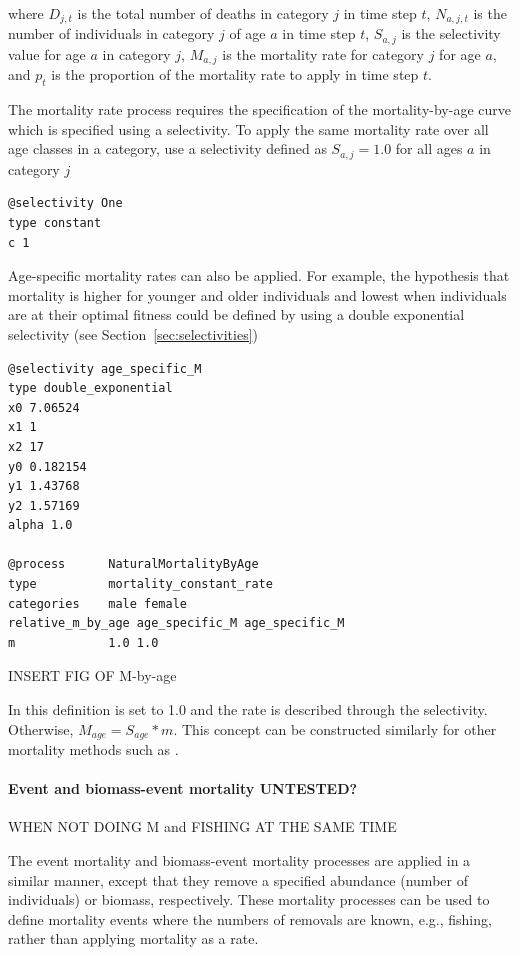where $D_{j,t}$ is the total number of deaths in category $j$ in time step $t$, $N_{a,j,t}$ is the number of individuals in category $j$ of age $a$ in time step $t$, $S_{a,j}$ is the selectivity value for age $a$ in category $j$, $M_{a,j}$ is the mortality rate for category $j$ for age $a$, and $p_t$ is the proportion of the mortality rate to apply in time step $t$.

The mortality rate process requires the specification of the mortality-by-age curve which is specified using a selectivity. To apply the same mortality rate over all age classes in a category, use a selectivity defined as $S_{a,j}=1.0$ for all ages $a$ in category $j$

{\small{\begin{verbatim}
@selectivity One
type constant
c 1
\end{verbatim}}}

Age-specific mortality rates can also be applied. For example, the hypothesis that mortality is higher for younger and older individuals and lowest when individuals are at their optimal fitness could be defined by using a double exponential selectivity (see Section~\ref{sec:selectivities})

{\small{\begin{verbatim}
@selectivity age_specific_M
type double_exponential
x0 7.06524
x1 1
x2 17
y0 0.182154
y1 1.43768
y2 1.57169
alpha 1.0

@process      NaturalMortalityByAge
type          mortality_constant_rate
categories    male female
relative_m_by_age age_specific_M age_specific_M
m             1.0 1.0
\end{verbatim}}}

INSERT FIG OF M-by-age

In this definition  is set to 1.0 and the rate is described through the selectivity. Otherwise, $M_{age} = S_{age} * m$. This concept can be constructed similarly for other mortality methods such as .

\paragraph{Event and biomass-event mortality UNTESTED?}

WHEN NOT DOING M and FISHING AT THE SAME TIME

The event mortality and biomass-event mortality processes are applied in a similar manner, except that they remove a specified abundance (number of individuals) or biomass, respectively. These mortality processes can be used to define mortality events where the numbers of removals are known, e.g., fishing, rather than applying mortality as a rate.

